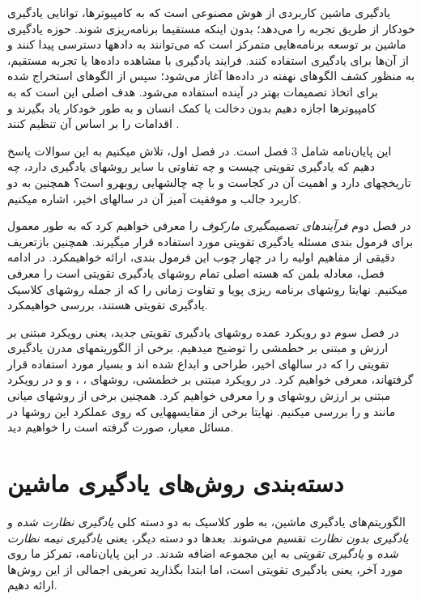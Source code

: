 
یادگیری ماشین کاربردی از هوش مصنوعی
است که به کامپیوترها، توانایی یادگیری خودکار از طریق تجربه  را می‌دهد؛ بدون اینکه مستقیما برنامه‌ریزی شوند. حوزه یادگیری ماشین بر توسعه برنامه‌هایی متمرکز است که می‌توانند به داده\nf ها دسترسی پیدا کنند و از آن‌ها برای یادگیری استفاده کنند. فرایند یادگیری با مشاهده داده‌ها یا تجربه مستقیم،  به منظور کشف الگوهای نهفته در داده‌ها آغاز می‌شود؛  سپس از الگوهای  استخراج شده برای اتخاذ تصمیمات بهتر در آینده استفاده می‌شود. هدف اصلی این است که به کامپیوترها اجازه دهیم بدون دخالت یا کمک انسان و به طور خودکار یاد بگیرند و اقدامات را بر اساس آن تنظیم کنند
\cite{mldef}.


این پایان‌نامه شامل 3 فصل است. در فصل اول، تلاش می\nf کنیم به این سوالات پاسخ دهیم که یادگیری تقویتی چیست و چه تفاوتی با سایر روش\nf های یادگیری دارد، چه تاریخچه\nf ای دارد و اهمیت آن در کجاست و با چه چالش\nf هایی روبه\nf رو است؟ همچنین به دو کاربرد جالب و موفقیت آمیز آن در سال\nf های اخیر، اشاره می\nf کنیم.

در فصل دوم \textit{فرآیندهای تصمیم\nf گیری مارکوف} را معرفی خواهیم کرد که به طور معمول برای  فرمول بندی مسئله یادگیری تقویتی مورد استفاده قرار می\nf گیرند. همچنین بازتعریف دقیقی از مفاهیم اولیه را در چهار چوب این فرمول بندی، ارائه خواهیم\nf کرد. در ادامه فصل، معادله بلمن که هسته اصلی تمام روش\nf های یادگیری تقویتی است را معرفی می\nf کنیم. نهایتا روش\nf های برنامه ریزی پویا و تفاوت زمانی  را که از جمله روش\nf های کلاسیک یادگیری تقویتی هستند، بررسی خواهیم\nf کرد.

در فصل سوم دو رویکرد عمده روش\nf های یادگیری تقویتی جدید، یعنی رویکرد مبتنی بر ارزش و مبتنی بر خط\nf مشی را توضیح می\nf دهیم. برخی از الگوریتم\nf های مدرن یادگیری تقویتی  را که در سال\nf های اخیر، طراحی و ابداع شده اند و بسیار مورد استفاده قرار گرفته\nf اند، معرفی خواهیم کرد. در رویکرد مبتنی بر خط\nf مشی، روش\nf های
،
،
و
و در رویکرد مبتنی بر ارزش روش\nf های
و
را معرفی خواهیم کرد. همچنین برخی از روش\nf های میانی مانند
و
را بررسی می\nf کنیم. نهایتا برخی از مقایسه\nf هایی که روی  عملکرد این روش\nf ها در مسائل معیار، صورت گرفته است را خواهیم دید.

\section{دسته‌بندی روش‌های یادگیری ماشین}
الگوریتم‌های یادگیری ماشین، به طور کلاسیک به دو دسته کلی 
\textit{یادگیری نظارت شده}
و 
\textit{یادگیری بدون نظارت}
تقسیم می‌شوند. بعدها دو دسته دیگر، یعنی 
\textit{یادگیری نیمه نظارت شده}
و
\textit{یادگیری تقویتی} 
  به این مجموعه اضافه شدند. در این پایان‌نامه، تمرکز ما روی مورد آخر، یعنی یادگیری تقویتی است، اما ابتدا بگذارید تعریفی اجمالی از این روش‌ها ارائه دهیم.
